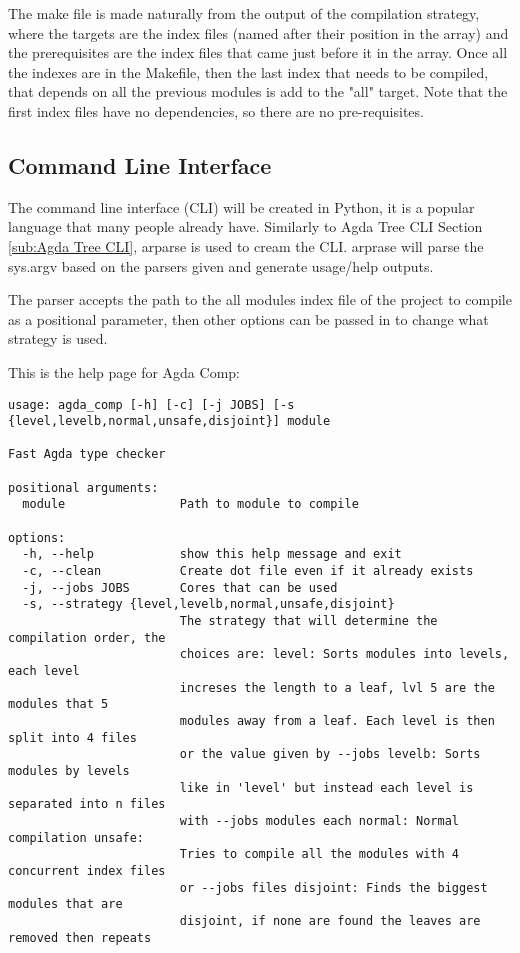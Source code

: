The make file is made naturally from the output of the compilation strategy,
where the targets are the index files (named after their position in the array)
and the prerequisites are the index files that came just before it in the
array. Once all the indexes are in the Makefile, then the last index that needs
to be compiled, that depends on all the previous modules is add to the "all"
target. Note that the first index files have no dependencies, so there are no
pre-requisites.


\subsection{Command Line Interface}

The command line interface (CLI) will be created in Python, it is a popular
language that many people already have. Similarly to Agda Tree CLI Section
\ref{sub:Agda Tree CLI}, arparse is used to cream the CLI. arprase will parse
the sys.argv based on the parsers given and generate usage/help outputs.

The parser accepts the path to the all modules index file of the project to
compile as a positional parameter, then other options can be passed in to
change what strategy is used.

This is the help page for Agda Comp:
\begin{lstlisting}
usage: agda_comp [-h] [-c] [-j JOBS] [-s {level,levelb,normal,unsafe,disjoint}] module

Fast Agda type checker

positional arguments:
  module                Path to module to compile

options:
  -h, --help            show this help message and exit
  -c, --clean           Create dot file even if it already exists
  -j, --jobs JOBS       Cores that can be used
  -s, --strategy {level,levelb,normal,unsafe,disjoint}
                        The strategy that will determine the compilation order, the
                        choices are: level: Sorts modules into levels, each level
                        increses the length to a leaf, lvl 5 are the modules that 5
                        modules away from a leaf. Each level is then split into 4 files
                        or the value given by --jobs levelb: Sorts modules by levels
                        like in 'level' but instead each level is separated into n files
                        with --jobs modules each normal: Normal compilation unsafe:
                        Tries to compile all the modules with 4 concurrent index files
                        or --jobs files disjoint: Finds the biggest modules that are
                        disjoint, if none are found the leaves are removed then repeats
\end{lstlisting}

